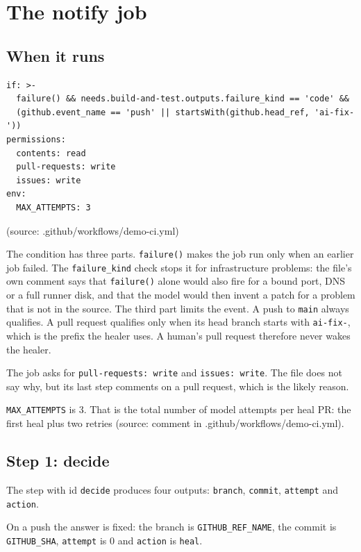 \documentclass[11pt,a4paper]{report}
\begin{document}
\section{The notify job}

\subsection{When it runs}

\begin{lstlisting}
if: >-
  failure() && needs.build-and-test.outputs.failure_kind == 'code' &&
  (github.event_name == 'push' || startsWith(github.head_ref, 'ai-fix-'))
permissions:
  contents: read
  pull-requests: write
  issues: write
env:
  MAX_ATTEMPTS: 3
\end{lstlisting}

(source: .github/workflows/demo-ci.yml)

The condition has three parts. \texttt{failure()} makes the job run only when an earlier job failed. The \texttt{failure\_\allowbreak{}kind} check stops it for infrastructure problems: the file's own comment says that \texttt{failure()} alone would also fire for a bound port, DNS or a full runner disk, and that the model would then invent a patch for a problem that is not in the source. The third part limits the event. A push to \texttt{main} always qualifies. A pull request qualifies only when its head branch starts with \texttt{ai-\allowbreak{}fix-\allowbreak{}}, which is the prefix the healer uses. A human's pull request therefore never wakes the healer.

The job asks for \texttt{pull-\allowbreak{}requests: write} and \texttt{issues: write}. The file does not say why, but its last step comments on a pull request, which is the likely reason.

\texttt{MAX\_\allowbreak{}ATTEMPTS} is 3. That is the total number of model attempts per heal PR: the first heal plus two retries (source: comment in .github/workflows/demo-ci.yml).

\subsection{Step 1: decide}

The step with id \texttt{decide} produces four outputs: \texttt{branch}, \texttt{commit}, \texttt{attempt} and \texttt{action}.

On a push the answer is fixed: the branch is \texttt{GITHUB\_\allowbreak{}REF\_\allowbreak{}NAME}, the commit is \texttt{GITHUB\_\allowbreak{}SHA}, \texttt{attempt} is 0 and \texttt{action} is \texttt{heal}.
\end{document}
